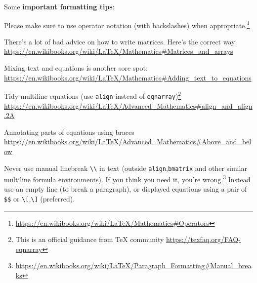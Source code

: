 \documentclass{amsart}
\begin{document}
 Some \textbf{important formatting tips}:
\begin{compactitem}
\item Please make sure to use operator notation (with backslashes) when appropriate.\footnote{\url{https://en.wikibooks.org/wiki/LaTeX/Mathematics\#Operators}}
\item There's a lot of bad advice on how to write matrices. Here's the correct way: \url{https://en.wikibooks.org/wiki/LaTeX/Mathematics\#Matrices_and_arrays}
\item Mixing text and equations is another sore spot: \url{https://en.wikibooks.org/wiki/LaTeX/Mathematics\#Adding_text_to_equations}
\item Tidy multiline equations (use \verb|align| instead of \verb|eqnarray|)\footnote{This is an official guidance from TeX community \url{https://texfaq.org/FAQ-eqnarray}} \url{https://en.wikibooks.org/wiki/LaTeX/Advanced_Mathematics\#align_and_align.2A}
\item Annotating parts of equations using braces \url{https://en.wikibooks.org/wiki/LaTeX/Advanced_Mathematics\#Above_and_below}
\item Never use manual linebreak \verb|\\| in text (outside \verb|align|,\verb|bmatrix| and other similar multiline formula environments). If you think you need it, you're wrong.\footnote{\url{https://en.wikibooks.org/wiki/LaTeX/Paragraph_Formatting\#Manual_breaks}} Instead use an empty line (to break a paragraph), or displayed equations using a pair of \verb|$$| or \verb|\[|,\verb|\]| (preferred).
\end{compactitem}
\end{document}
